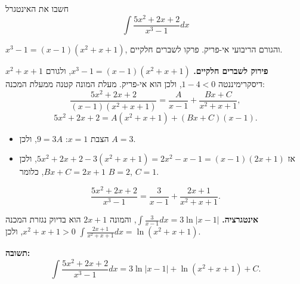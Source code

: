 
\begin{question}
חשבו את האינטגרל
\[ \int\frac{5x^2+2x+2}{x^3-1}dx \]
\end{question}

\begin{hint}
$x^3-1=(x-1)(x^2+x+1)$, והגורם הריבועי אי-פריק. פרקו לשברים חלקיים.
\end{hint}

\begin{solution}
\textbf{פירוק לשברים חלקיים.} $x^3-1=(x-1)(x^2+x+1)$, ולגורם $x^2+x+1$ דיסקרימיננטה $1-4<0$, ולכן הוא אי-פריק. מעלת המונה קטנה ממעלת המכנה:
\[ \frac{5x^2+2x+2}{(x-1)(x^2+x+1)}=\frac{A}{x-1}+\frac{Bx+C}{x^2+x+1}, \]
\[ 5x^2+2x+2=A(x^2+x+1)+(Bx+C)(x-1). \]
\begin{itemize}
  \item הצבת $x=1$: $9=3A$, ולכן $A=3$.
  \item אז $5x^2+2x+2-3(x^2+x+1)=2x^2-x-1=(x-1)(2x+1)$, ולכן $Bx+C=2x+1$, כלומר $B=2$, $C=1$.
\end{itemize}
\[ \frac{5x^2+2x+2}{x^3-1}=\frac{3}{x-1}+\frac{2x+1}{x^2+x+1}. \]

\textbf{אינטגרציה.} $\int\frac{3}{x-1}dx=3\ln|x-1|$, והמונה $2x+1$ הוא בדיוק נגזרת המכנה $x^2+x+1>0$, ולכן $\int\frac{2x+1}{x^2+x+1}dx=\ln(x^2+x+1)$.

\textbf{תשובה:}
\[ \int\frac{5x^2+2x+2}{x^3-1}dx=\boxed{3\ln|x-1|+\ln(x^2+x+1)+C}. \]
\end{solution}
